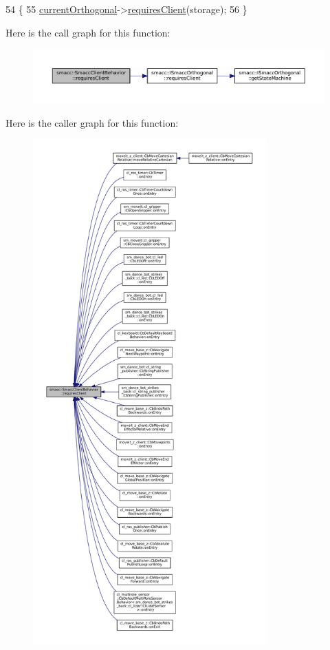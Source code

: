 \begin{DoxyCode}
54 \{
55     \hyperlink{classsmacc_1_1SmaccClientBehavior_a37e6a2fe61c3a72ed2f3e4180f552089}{currentOrthogonal}->\hyperlink{classsmacc_1_1ISmaccOrthogonal_a602e16b09f8a1b3de889f2f3d90a3211}{requiresClient}(storage);
56 \}
\end{DoxyCode}
Here is the call graph for this function\+:
\nopagebreak
\begin{figure}[H]
\begin{center}
\leavevmode
\includegraphics[width=350pt]{classsmacc_1_1SmaccClientBehavior_a917f001e763a1059af337bf4e164f542_cgraph}
\end{center}
\end{figure}
Here is the caller graph for this function\+:
\nopagebreak
\begin{figure}[H]
\begin{center}
\leavevmode
\includegraphics[height=550pt]{classsmacc_1_1SmaccClientBehavior_a917f001e763a1059af337bf4e164f542_icgraph}
\end{center}
\end{figure}
